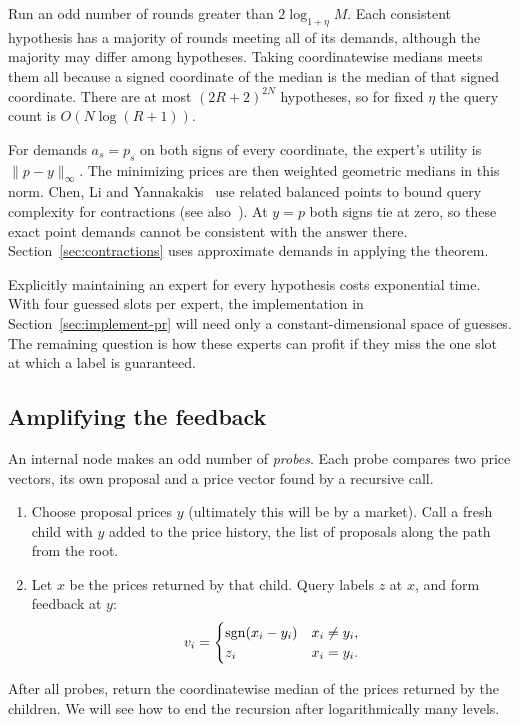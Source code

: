 Run an odd number of rounds greater than \(2\log_{1+\eta}M\).
Each consistent hypothesis has a majority of rounds meeting all of
its demands, although the majority may differ among hypotheses.
Taking coordinatewise medians meets them all because a signed
coordinate of the median is the median of that signed coordinate.
There are at most \((2R+2)^{2N}\) hypotheses, so for fixed \(\eta\)
the query count is \(O(N\log(R+1))\).

For demands \(a_s=p_s\) on both signs of every coordinate, the
expert's utility is \(\|p-y\|_\infty\). The minimizing prices are
then weighted geometric medians in this norm. Chen, Li and
Yannakakis~\cite{CLY} use related balanced points to bound query
complexity for contractions (see also~\cite{HLSW,FH}). At \(y=p\)
both signs tie at zero, so these exact point demands cannot be
consistent with the answer there. Section~\ref{sec:contractions}
uses approximate demands in applying the theorem.

Explicitly maintaining an expert for every hypothesis costs exponential
time. With four guessed slots per expert, the implementation in
Section~\ref{sec:implement-pr} will need only a constant-dimensional
space of guesses. The remaining question is how these experts can
profit if they miss the one slot at which a label is guaranteed.

\subsection{Amplifying the feedback}\label{sec:amplify}

An internal node makes an odd number of \emph{probes}. Each probe
compares two price vectors, its own proposal and a price vector found
by a recursive call.

\begin{enumerate}
 \item Choose proposal prices \(y\) (ultimately this will be by a market).
 Call a fresh child with \(y\) added to the price history,
 the list of proposals along the path from the root.
 \item Let \(x\) be the prices returned by that child.
 Query labels \(z\) at \(x\), and form feedback at \(y\):
 \begin{equation}\label{eq:feedback}
 v_i =
 \begin{cases}
     \operatorname{sgn}(x_i-y_i) & x_i\ne y_i,\\
     z_i & x_i=y_i.
 \end{cases}
 \end{equation}
\end{enumerate}
After all probes, return the coordinatewise median of the prices
returned by the children. We will see how to end the recursion
after logarithmically many levels.

